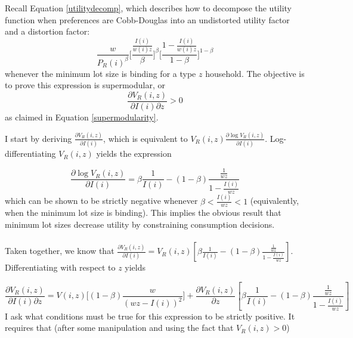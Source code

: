 \documentclass[12pt]{article}
\begin{document}
	Recall Equation \eqref{utilitydecomp}, which describes how to decompose the utility function when preferences are Cobb-Douglas into an undistorted utility factor and a distortion factor: $$\frac{w}{P_{R}(i)^{\beta}}\biggl[\frac{\frac{I(i)}{w(i)z}}{\beta}\biggl]^{\beta}\biggl[\frac{1- \frac{I(i)}{w(i)z}}{1-\beta}\biggl]^{1 - \beta}$$
	whenever the minimum lot size is binding for a type $z$ household. The objective is to prove this expression is supermodular, or $$\frac{\partial V_{R}(i, z)}{\partial I(i) \partial z } > 0$$ as claimed in Equation \eqref{supermodularity}. 
	
	I start by deriving $\frac{\partial V_{R}(i, z)}{\partial I(i)}$, which is equivalent to $V_{R}(i, z) \frac{\partial \log V_{R}(i, z)}{\partial I(i)}$. Log-differentiating $V_{R}(i, z)$ yields the expression 
	
	$$\frac{\partial \log V_{R}(i, z)}{\partial I(i)} = \beta\frac{1}{I(i)} - (1-\beta)\frac{\frac{1}{wz}}{1 - \frac{I(i)}{wz}} $$
	which can be shown to be strictly negative whenever $\beta < \frac{I(i)}{wz} < 1$ (equivalently, when the minimum lot size is binding). This implies the obvious result that minimum lot sizes decrease utility by constraining consumption decisions. 
	\paragraph*{}
	Taken together, we know that $\frac{\partial V_{R}(i, z)}{\partial I(i)} = V_{R}(i, z)[\beta\frac{1}{I(i)} - (1-\beta)\frac{\frac{1}{wz}}{1 - \frac{I(i)}{wz}}]$. Differentiating with respect to $z$ yields 
	
	$$\frac{\partial V_{R}(i, z)}{\partial I(i) \partial z}  = V(i, z)\bigg[(1-\beta) \frac{w}{(wz - I(i))^{2}}\bigg] + \frac{\partial V_{R}(i, z)}{\partial z}[\beta\frac{1}{I(i)} - (1-\beta)\frac{\frac{1}{wz}}{1 - \frac{I(i)}{wz}}]$$
	I ask what conditions must be true for this expression to be strictly positive. It requires that (after some manipulation and using the fact that $V_{R}(i, z) > 0$)
	
\end{document}
